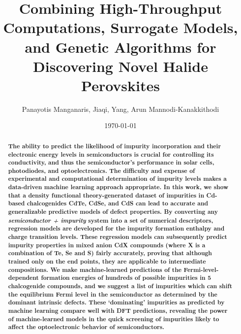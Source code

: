 \documentclass[aip, jmp, amsmath, amssymb, preprint]{revtex4-2}
\begin{document}
\title[]{Combining High-Throughput Computations, Surrogate Models, and Genetic Algorithms for Discovering Novel Halide Perovskites}



\author{Panayotis Manganaris, Jiaqi, Yang, Arun Mannodi-Kanakkithodi}
%

\date{\today}%




\maketitle




\begin{abstract}

\textbf{The ability to predict the likelihood of impurity incorporation and their electronic energy levels in semiconductors is crucial for controlling its conductivity, and thus the semiconductor's performance in solar cells, photodiodes, and optoelectronics. The difficulty and expense of experimental and computational determination of impurity levels makes a data-driven machine learning approach appropriate. In this work, we show that a density functional theory-generated dataset of impurities in Cd-based chalcogenides CdTe, CdSe, and CdS can lead to accurate and generalizable predictive models of defect properties. By converting any \textit{semiconductor + impurity} system into a set of numerical descriptors, regression models are developed for the impurity formation enthalpy and charge transition levels. These regression models can subsequently predict impurity properties in mixed anion CdX compounds (where X is a combination of Te, Se and S) fairly accurately, proving that although trained only on the end points, they are applicable to intermediate compositions. We make machine-learned predictions of the Fermi-level-dependent formation energies of hundreds of possible impurities in 5 chalcogenide compounds, and we suggest a list of impurities which can shift the equilibrium Fermi level in the semiconductor as determined by the dominant intrinsic defects. These `dominating' impurities as predicted by machine learning compare well with DFT predictions, revealing the power of machine-learned models in the quick screening of impurities likely to affect the optoelectronic behavior of semiconductors.}

\end{abstract}
\end{document}
